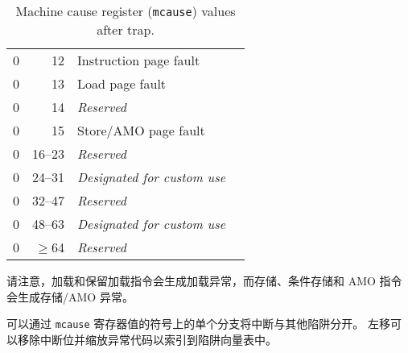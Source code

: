 \begin{table*}[htbp]
\begin{center}
\begin{tabular}{|r|r|l|l|}
  0         & 12              & Instruction page fault \\
  0         & 13              & Load page fault \\
  0         & 14              & {\em Reserved} \\
  0         & 15              & Store/AMO page fault \\
  0         & 16--23          & {\em Reserved} \\
  0         & 24--31          & {\em Designated for custom use} \\
  0         & 32--47          & {\em Reserved} \\
  0         & 48--63          & {\em Designated for custom use} \\
  0         & $\ge$64         & {\em Reserved} \\
  \hline

\end{tabular}
\end{center}
\caption{Machine cause register ({\tt mcause}) values after trap.}
\label{mcauses}
\end{table*}

\iffalse
Note that load and load-reserved instructions generate load exceptions,
whereas store, store-conditional, and AMO instructions generate store/AMO
exceptions.
\fi
请注意，加载和保留加载指令会生成加载异常，而存储、条件存储和 AMO 指令会生成存储/AMO 异常。

\iffalse
\begin{commentary}
Interrupts can be separated from other traps with a single branch on the sign of
the {\tt mcause} register value.  A shift left can remove the
interrupt bit and scale the exception codes to index into a trap
vector table.
\end{commentary}
\fi

\begin{commentary}
可以通过 {\tt mcause} 寄存器值的符号上的单个分支将中断与其他陷阱分开。 左移可以移除中断位并缩放异常代码以索引到陷阱向量表中。
\end{commentary}

\iffalse
\begin{commentary}
We do not distinguish privileged instruction exceptions from illegal
opcode exceptions.  This simplifies the architecture and also hides
details of which higher-privilege instructions are supported by an
implementation.  The privilege level servicing the trap can implement
a policy on whether these need to be distinguished, and if so, whether
a given opcode should be treated as illegal or privileged.
\end{commentary}
\fi

